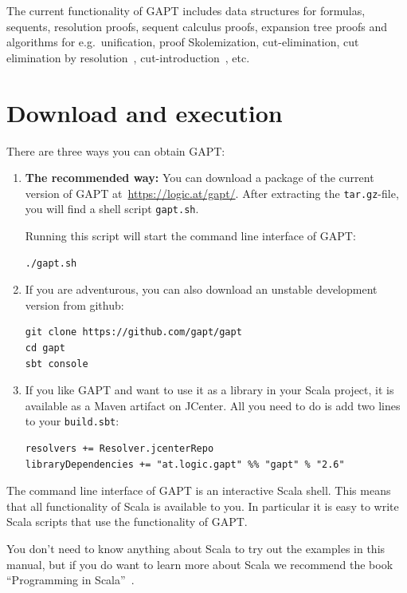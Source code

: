 \documentclass[a4paper,11pt]{article}
\begin{document}
The current functionality of GAPT includes data structures for formulas,
sequents, resolution proofs, sequent calculus proofs, expansion tree proofs and
algorithms for e.g.\ unification, proof Skolemization, cut-elimination, cut
elimination by resolution~\cite{Baaz00CutElimination},
cut-introduction~\cite{Hetzl2012}, etc.

\section{Download and execution}

There are three ways you can obtain GAPT:

\begin{enumerate}

\item {\bfseries The recommended way:}  You can download a package of the current
version of GAPT at~\url{https://logic.at/gapt/}.  After extracting
the \texttt{tar.gz}-file, you will find a shell script \texttt{gapt.sh}.

Running this script will start the command line interface of GAPT:
\begin{lstlisting}
./gapt.sh
\end{lstlisting}

\item If you are adventurous, you can also download an unstable development
  version from github:
\begin{lstlisting}
git clone https://github.com/gapt/gapt
cd gapt
sbt console
\end{lstlisting}

\item If you like GAPT and want to use it as a library in your Scala project,
  it is available as a Maven artifact on JCenter.  All you need to do is add
  two lines to your \verb,build.sbt,:
\begin{lstlisting}
resolvers += Resolver.jcenterRepo
libraryDependencies += "at.logic.gapt" %% "gapt" % "2.6"
\end{lstlisting}

\end{enumerate}

The command line interface of GAPT is an interactive Scala shell.  This means
that all functionality of Scala is available to you.  In particular it is easy
to write Scala scripts that use the functionality of GAPT.

You don't need to know anything about Scala to try out the examples in this
manual, but if you do want to learn more about Scala we recommend the book
``Programming in Scala''~\cite{odersky2008programming}.
\end{document}
